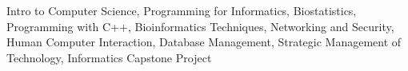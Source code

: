       \resumeItemListStart
      
         {Intro to Computer Science, Programming for Informatics, Biostatistics, Programming with C++, Bioinformatics Techniques, Networking and Security, Human Computer Interaction, Database Management, Strategic Management of Technology, Informatics Capstone Project}
      
      \resumeItemListEnd
   
   \resumeSubHeadingListEnd

%
%
%      
%


